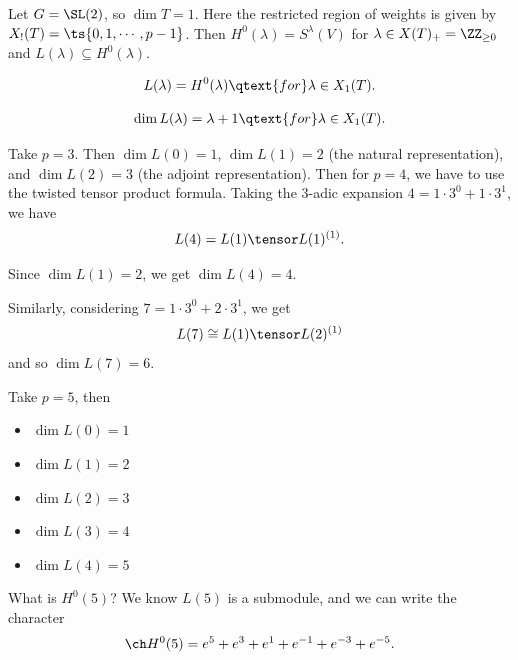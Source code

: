\begin{example}

Let \(G= \SL(2)\), so \(\dim T =1\). Here the restricted region of
weights is given by \(X_!(T) = \ts{0,1,\cdots, p-1}\). Then
\(H^0(\lambda) = S^\lambda(V)\) for
\(\lambda \in X(T)_+ = \ZZ_{\geq 0}\) and
\(L(\lambda) \subseteq H^0(\lambda)\).

\begin{theorem}[?]

\begin{align*}  
L(\lambda) =  H^0(\lambda) \qtext{for} \lambda \in X_1(T)
.\end{align*}

\end{theorem}

\begin{theorem}[?]

\begin{align*}  
\dim L(\lambda) = \lambda + 1 \qtext{for} \lambda \in X_1(T)
.\end{align*}

\end{theorem}

Take \(p=3\). Then \(\dim L(0) = 1\), \(\dim L(1) = 2\) (the natural
representation), and \(\dim L(2) = 3\) (the adjoint representation).
Then for \(p=4\), we have to use the twisted tensor product formula.
Taking the 3-adic expansion \(4 = 1\cdot 3^0 + 1\cdot 3^1\), we have
\begin{align*}  
L(4) = L(1) \tensor L(1)^{(1)}
.\end{align*}

Since \(\dim L(1) = 2\), we get \(\dim L(4) = 4\).

Similarly, considering \(7 = 1\cdot 3^0 + 2\cdot 3^1\), we get
\begin{align*}  
L(7) \cong L(1) \tensor L(2)^{(1)}
\end{align*} and so \(\dim L(7) = 6\).

Take \(p=5\), then

\begin{itemize}
\tightlist
\item
  \(\dim L(0) = 1\)
\item
  \(\dim L(1) = 2\)
\item
  \(\dim L(2) = 3\)
\item
  \(\dim L(3) = 4\)
\item
  \(\dim L(4) = 5\)
\end{itemize}

What is \(H^0(5)\)? We know \(L(5)\) is a submodule, and we can write
the character
\begin{align*}  
\ch H^0(5) = e^5 + e^3 + e^1 + e^{-1} + e^{-3} + e^{-5}
.\end{align*}


\end{example}
